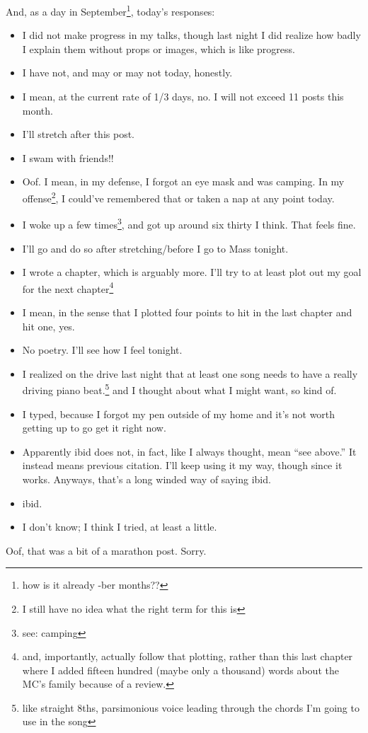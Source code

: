 \documentclass[12pt]{article}[titlepage]
\newcommand{\say}[1]{``#1''}
\renewcommand{\,}{\textsuperscript{,}}
\begin{document}
And, as a day in September\footnote{how is it already -ber months??}, today's responses:
\begin{itemize}
\item I did not make progress in my talks, though last night I did realize how badly I explain them without props or images, which is like progress.
\item I have not, and may or may not today, honestly.
\item I mean, at the current rate of 1/3 days, no. I will not exceed 11 posts this month.
\item I'll stretch after this post.
\item I swam with friends!!
\item Oof.
I mean, in my defense, I forgot an eye mask and was camping.
In my offense\footnote{I still have no idea what the right term for this is}, I could've remembered that or taken a nap at any point today.
\item I woke up a few times\footnote{see: camping}, and got up around six thirty I think.
That feels fine.
\item I'll go and do so after stretching/before I go to Mass tonight.
\item I wrote a chapter, which is arguably more.
I'll try to at least plot out my goal for the next chapter\footnote{and, importantly, actually follow that plotting, rather than this last chapter where I added fifteen hundred (maybe only a thousand) words about the MC's family because of a review.}
\item I mean, in the sense that I plotted four points to hit in the last chapter and hit one, yes.
\item No poetry. I'll see how I feel tonight.
\item I realized on the drive last night that at least one song needs to have a really driving piano beat.\footnote{like straight 8ths, parsimonious voice leading through the chords I'm going to use in the song} and I thought about what I might want, so kind of.
\item I typed, because I forgot my pen outside of my home and it's not worth getting up to go get it right now.
\item Apparently ibid does not, in fact, like I always thought, mean \say{see above.} 
It instead means previous citation.
I'll keep using it my way, though since it works.
Anyways, that's a long winded way of saying ibid.
\item ibid.
\item I don't know;
I think I tried, at least a little.
\end{itemize}
Oof, that was a bit of a marathon post.
Sorry.
\end{document}
